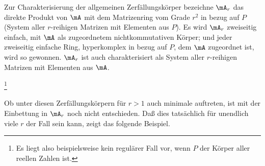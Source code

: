 Zur Charakterisierung der allgemeinen Zerfällungskörper bezeichne $\mA_r$ das direkte Produkt von $\mA$ mit dem Matrizenring vom Grade $r^2$ in bezug auf $P$ (System aller $r$-reihigen Matrizen mit Elementen aus $P$). Es wird $\mA_r$ zweiseitig einfach, mit $\mA$ als zugeordnetem nichtkommutativen Körper; und jeder zweiseitig einfache Ring, hyperkomplex in bezug auf $P$, dem $\mA$ zugeordnet ist, wird so gewonnen. $\mA_r$ ist auch charakterisiert als System aller $r$-reihigen Matrizen mit Elementen aus $\mA$.

\footnote{Es liegt also beispielsweise kein regulärer Fall vor, wenn $P$ der Körper aller reellen Zahlen ist.}

Ob unter diesen Zerfällungskörpern für $r>1$ auch minimale auftreten, ist mit der Einbettung in $\mA_r$ noch nicht entschieden. Daß dies tatsächlich für unendlich viele $r$ der Fall sein kann, zeigt das folgende Beispiel.
